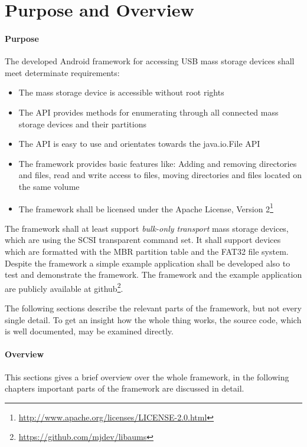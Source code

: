 \chapter{Purpose and Overview}

\subsubsection{Purpose}
\label{implementation_purpose}

The developed Android framework for accessing USB mass storage devices shall meet determinate requirements:

\begin{itemize}
\item The mass storage device is accessible without root rights
\item The API provides methods for enumerating through all connected mass storage devices and their partitions
\item The API is easy to use and orientates towards the java.io.File API
\item The framework provides basic features like: Adding and removing directories and files, read and write access to files, moving directories and files located on the same volume
\item The framework shall be licensed under the Apache License, Version 2\footnote{\url{http://www.apache.org/licenses/LICENSE-2.0.html}}
\end{itemize}

The framework shall at least support \textit{bulk-only transport} mass storage devices, which are using the SCSI transparent command set. It shall support devices which are formatted with the MBR partition table and the FAT32 file system. Despite the framework a simple example application shall be developed also to test and demonstrate the framework. The framework and the example application are publicly available at github\footnote{\url{https://github.com/mjdev/libaums}}.

The following sections describe the relevant parts of the framework, but not every single detail. To get an insight how the whole thing works, the source code, which is well documented, may be examined directly.

\subsubsection{Overview}
\label{implementation_overview}

This sections gives a brief overview over the whole framework, in the following chapters important parts of the framework are discussed in detail.

